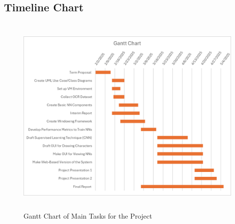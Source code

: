 \documentclass[english,12pt]{article}
\begin{document}
\subsection{Timeline Chart}

\begin{figure}[H]
  \includegraphics[width=15cm, height=10cm]{images/Colin's Gantt Chart.png}
  \caption*{Gantt Chart of Main Tasks for the Project}
\end{figure}
\end{document}
